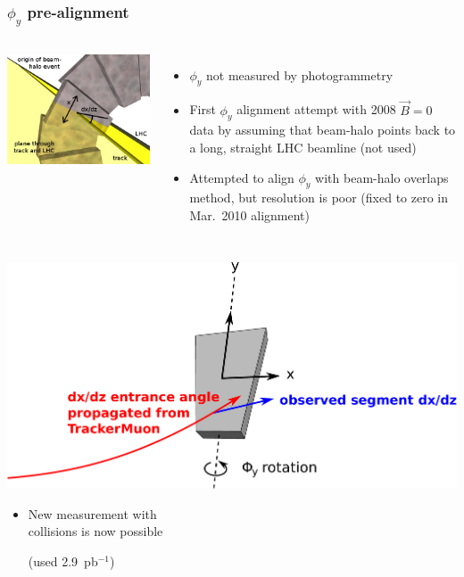 \documentclass[compress]{beamer}
\begin{document}
\begin{frame}
\frametitle{$\phi_y$ pre-alignment}

\begin{columns}
\includegraphics[width=\linewidth]{track_lhc_plane_closeup.png}

\begin{itemize}
\item $\phi_y$ not measured by photogrammetry
\item First $\phi_y$ alignment attempt with 2008 $\vec{B}=0$ data by
  assuming that beam-halo points back to a long, straight LHC beamline
  (not used)
\item Attempted to align $\phi_y$ with beam-halo overlaps method, but
  resolution is poor (fixed to zero in Mar.~2010 alignment)
\end{itemize}
\end{columns}

\hfill \includegraphics[width=0.8\linewidth]{collisions_phiy.pdf}

\vspace{-4.3 cm}
\begin{itemize}
\item New measurement with \\ collisions is now possible

(used 2.9~pb$^{-1}$)
\end{itemize}

\vspace{4 cm}
\end{frame}
\end{document}
